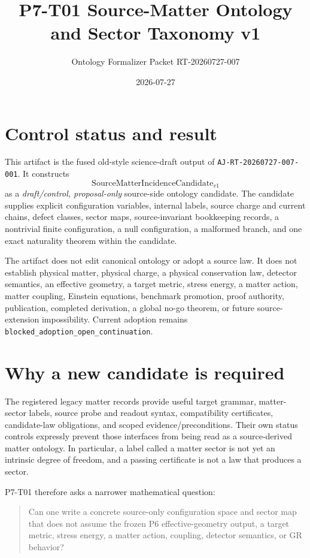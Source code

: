 \documentclass[11pt]{article}
\title{P7-T01 Source-Matter Ontology and Sector Taxonomy v1}
\author{Ontology Formalizer Packet RT-20260727-007}
\date{2026-07-27}
\begin{document}
\maketitle

\section{Control status and result}

This artifact is the fused old-style science-draft output of
\texttt{AJ-RT-20260727-007-001}. It constructs
\[
  \mathrm{SourceMatterIncidenceCandidate}_{v1}
\]
as a \emph{draft/control, proposal-only} source-side ontology candidate. The
candidate supplies explicit configuration variables, internal labels, source
charge and current chains, defect classes, sector maps, source-invariant
bookkeeping records, a nontrivial finite configuration, a null
configuration, a malformed branch, and one exact naturality theorem within
the candidate.

The artifact does not edit canonical ontology or adopt a source law. It does
not establish physical matter, physical charge, a physical conservation law,
detector semantics, an effective geometry, a target metric, stress energy, a
matter action, matter coupling, Einstein equations, benchmark promotion,
proof authority, publication, completed derivation, a global no-go theorem,
or future source-extension impossibility. Current adoption remains
\texttt{blocked\_adoption\_open\_continuation}.

\section{Why a new candidate is required}

The registered legacy matter records provide useful target grammar,
matter-sector labels, source probe and readout syntax, compatibility
certificates, candidate-law obligations, and scoped evidence/preconditions.
Their own status controls expressly prevent those interfaces from being read
as a source-derived matter ontology. In particular, a label called a matter
sector is not yet an intrinsic degree of freedom, and a passing certificate is
not a law that produces a sector.

P7-T01 therefore asks a narrower mathematical question:

\begin{quote}
Can one write a concrete source-only configuration space and sector map that
does not assume the frozen P6 effective-geometry output, a target metric,
stress energy, a matter action, coupling, detector semantics, or GR behavior?
\end{quote}
\end{document}
